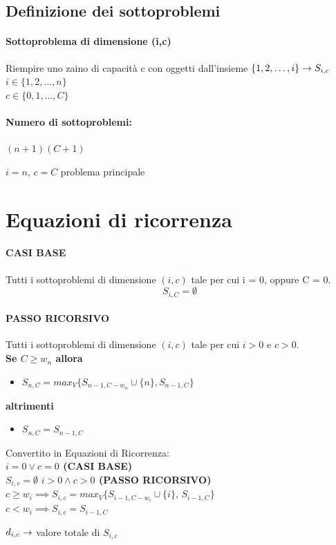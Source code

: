\subsection{Definizione dei sottoproblemi}
\paragraph*{Sottoproblema di dimensione (i,c)}
Riempire uno zaino di capacità c con oggetti dall'insieme $\{1,2,\dots,i\} \rightarrow S_{i,c}$\\
$i \in \{1,2,\dots,n\}$\\
$c \in \{0,1,\dots,C\}$
\paragraph*{Numero di sottoproblemi:}$(n+1)(C+1)$
\begin{mdframed}[backgroundcolor=yellow]
    $i=n,\, c=C$ \ra problema principale
\end{mdframed}
\section{Equazioni di ricorrenza}
\paragraph*{CASI BASE} \ra Tutti i sottoproblemi di dimensione $(i,c)$ tale per cui i = 0, oppure
C = 0.
\[S_{i,C} = \emptyset\]
\paragraph*{PASSO RICORSIVO} \ra Tutti i sottoproblemi di dimensione $(i,c)$ tale per cui
$i>0$ e $c>0$.\\
\textbf{Se $C \geq w_n$ allora}
\begin{itemize}
    \item $S_{n,C} = max_V\{S_{n-1, C-w_n} \cup \{n\},S_{n-1, C}\}$
\end{itemize}
\textbf{altrimenti}
\begin{itemize}
    \item $S_{n,C} = S_{n-1,C}$
\end{itemize}
Convertito in Equazioni di Ricorrenza:\\
\textbf{$i=0 \vee c=0$ (CASI BASE)}\\
$S_{i,c} = \emptyset$
\textbf{$i>0 \wedge c>0$ (PASSO RICORSIVO)}\\
$c \geq w_i \implies S_{i,c} = max_V\{S_{i-1,C-w_i} \cup \{i\},\,S_{i-1,C}\}$\\
$c < w_i \implies S_{i,c} = S_{i-1,C}$\\
\begin{mdframed}[backgroundcolor=yellow]
    $d_{i,c} \rightarrow$ valore totale di $S_{i,c}$
\end{mdframed}
